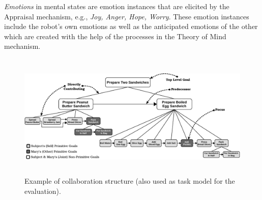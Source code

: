 \documentclass{article}
\begin{document}

\textit{Emotions} in mental states are emotion instances that are elicited by
the Appraisal mechanism, e.g., \textit{Joy, Anger, Hope, Worry}. These emotion
instances include the robot's own emotions as well as the anticipated emotions
of the other which are created with the help of the processes in the Theory of
Mind mechanism. 


\begin{figure}
  \centering
  \vspace*{-5mm}
  \includegraphics[width=16.5cm,height=6cm]{figure/taskModel-croped.pdf}
  \vspace*{-3mm}
  \caption{Example of collaboration structure (also used as task model for
  the evaluation).}
  \label{fig:taskModel}
  \vspace*{-4mm}
\end{figure}
\end{document}
